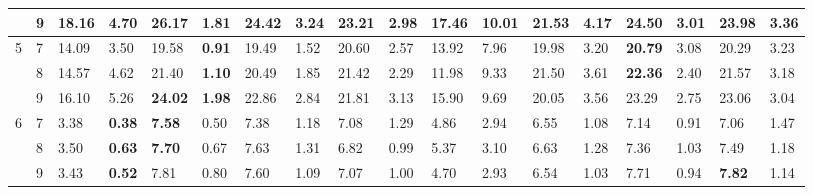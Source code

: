 \documentclass[conference]{IEEEtran}
\begin{document}
\begin{table}[]
\begin{tabular}{|cl|ll|ll|ll|ll|ll|ll|ll|ll|}
		\multicolumn{1}{|c|}{} & 9 & \multicolumn{1}{l|}{18.16} & 4.70 & \multicolumn{1}{l|}{\textbf{26.17}} & \textbf{1.81} & \multicolumn{1}{l|}{24.42} & 3.24 & \multicolumn{1}{l|}{23.21} & 2.98 & \multicolumn{1}{l|}{17.46} & 10.01 & \multicolumn{1}{l|}{21.53} & 4.17 & \multicolumn{1}{l|}{24.50} & 3.01 & \multicolumn{1}{l|}{23.98} & 3.36 \\ \hline
		\multicolumn{1}{|c|}{\multirow{3}{*}{5}} & 7 & \multicolumn{1}{l|}{14.09} & 3.50 & \multicolumn{1}{l|}{19.58} & \textbf{0.91} & \multicolumn{1}{l|}{19.49} & 1.52 & \multicolumn{1}{l|}{20.60} & 2.57 & \multicolumn{1}{l|}{13.92} & 7.96 & \multicolumn{1}{l|}{19.98} & 3.20 & \multicolumn{1}{l|}{\textbf{20.79}} & 3.08 & \multicolumn{1}{l|}{20.29} & 3.23 \\ \cline{2-18} 
		\multicolumn{1}{|c|}{} & 8 & \multicolumn{1}{l|}{14.57} & 4.62 & \multicolumn{1}{l|}{21.40} & \textbf{1.10} & \multicolumn{1}{l|}{20.49} & 1.85 & \multicolumn{1}{l|}{21.42} & 2.29 & \multicolumn{1}{l|}{11.98} & 9.33 & \multicolumn{1}{l|}{21.50} & 3.61 & \multicolumn{1}{l|}{\textbf{22.36}} & 2.40 & \multicolumn{1}{l|}{21.57} & 3.18 \\ \cline{2-18} 
		\multicolumn{1}{|c|}{} & 9 & \multicolumn{1}{l|}{16.10} & 5.26 & \multicolumn{1}{l|}{\textbf{24.02}} & \textbf{1.98} & \multicolumn{1}{l|}{22.86} & 2.84 & \multicolumn{1}{l|}{21.81} & 3.13 & \multicolumn{1}{l|}{15.90} & 9.69 & \multicolumn{1}{l|}{20.05} & 3.56 & \multicolumn{1}{l|}{23.29} & 2.75 & \multicolumn{1}{l|}{23.06} & 3.04 \\ \hline
		\multicolumn{1}{|c|}{\multirow{3}{*}{6}} & 7 & \multicolumn{1}{l|}{3.38} & \textbf{0.38} & \multicolumn{1}{l|}{\textbf{7.58}} & 0.50 & \multicolumn{1}{l|}{7.38} & 1.18 & \multicolumn{1}{l|}{7.08} & 1.29 & \multicolumn{1}{l|}{4.86} & 2.94 & \multicolumn{1}{l|}{6.55} & 1.08 & \multicolumn{1}{l|}{7.14} & 0.91 & \multicolumn{1}{l|}{7.06} & 1.47 \\ \cline{2-18} 
		\multicolumn{1}{|c|}{} & 8 & \multicolumn{1}{l|}{3.50} & \textbf{0.63} & \multicolumn{1}{l|}{\textbf{7.70}} & 0.67 & \multicolumn{1}{l|}{7.63} & 1.31 & \multicolumn{1}{l|}{6.82} & 0.99 & \multicolumn{1}{l|}{5.37} & 3.10 & \multicolumn{1}{l|}{6.63} & 1.28 & \multicolumn{1}{l|}{7.36} & 1.03 & \multicolumn{1}{l|}{7.49} & 1.18 \\ \cline{2-18} 
		\multicolumn{1}{|c|}{} & 9 & \multicolumn{1}{l|}{3.43} & \textbf{0.52} & \multicolumn{1}{l|}{7.81} & 0.80 & \multicolumn{1}{l|}{7.60} & 1.09 & \multicolumn{1}{l|}{7.07} & 1.00 & \multicolumn{1}{l|}{4.70} & 2.93 & \multicolumn{1}{l|}{6.54} & 1.03 & \multicolumn{1}{l|}{7.71} & 0.94 & \multicolumn{1}{l|}{\textbf{7.82}} & 1.14 \\ \hline

\end{tabular}
\end{table}
\end{document}
